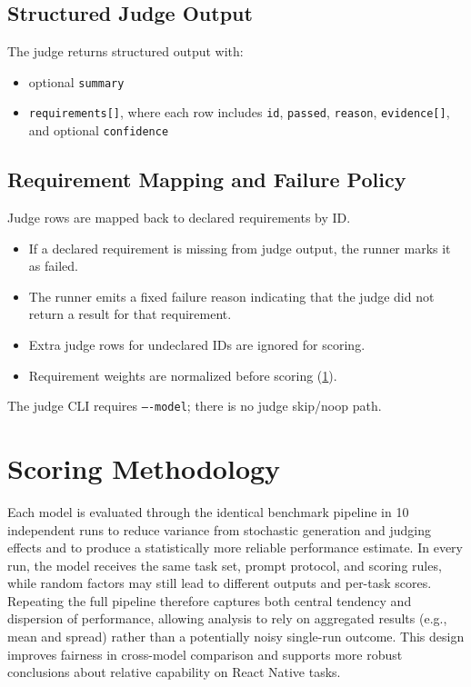 \documentclass[11pt]{article}
\begin{document}
\subsection{Structured Judge Output}
The judge returns structured output with:
\begin{itemize}
  \item optional \texttt{summary}
  \item \texttt{requirements[]}, where each row includes \texttt{id}, \texttt{passed}, \texttt{reason}, \texttt{evidence[]}, and optional \texttt{confidence}
\end{itemize}

\subsection{Requirement Mapping and Failure Policy}
Judge rows are mapped back to declared requirements by ID.
\begin{itemize}
  \item If a declared requirement is missing from judge output, the runner marks it as failed.
  \item The runner emits a fixed failure reason indicating that the judge did not return a result for that requirement.
  \item Extra judge rows for undeclared IDs are ignored for scoring.
  \item Requirement weights are normalized before scoring (\cref{sec:scoring}).
\end{itemize}

The judge CLI requires \texttt{----model}; there is no judge skip/noop path.

\section{Scoring Methodology}
\label{sec:scoring}

Each model is evaluated through the identical benchmark pipeline in 10 independent runs to reduce variance from stochastic generation and judging effects and to produce a statistically more reliable performance estimate. In every run, the model receives the same task set, prompt protocol, and scoring rules, while random factors may still lead to different outputs and per-task scores. Repeating the full pipeline therefore captures both central tendency and dispersion of performance, allowing analysis to rely on aggregated results (e.g., mean and spread) rather than a potentially noisy single-run outcome. This design improves fairness in cross-model comparison and supports more robust conclusions about relative capability on React Native tasks.
\end{document}
